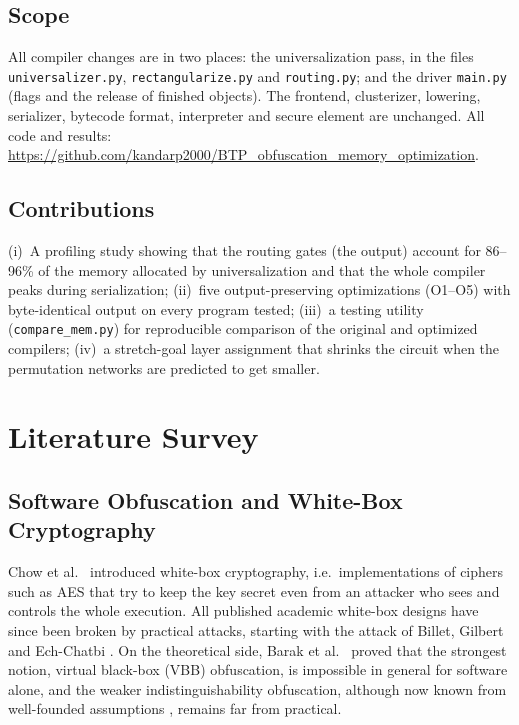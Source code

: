 \documentclass[12pt,a4paper,oneside]{report}
\newcommand{\code}[1]{\texttt{#1}}
\begin{document}
\section{Scope}
{\sloppy All compiler changes are in two places: the universalization pass, in the files
\code{universalizer.py}, \code{rectangularize.py} and \code{routing.py}; and the driver
\code{main.py} (flags and the release of finished objects). The frontend, clusterizer, lowering,
serializer, bytecode format, interpreter and secure element are unchanged. All code and results:
\url{https://github.com/kandarp2000/BTP_obfuscation_memory_optimization}.\par}

\section{Contributions}
(i)~A profiling study showing that the routing gates (the output) account for 86--96\% of the
memory allocated by universalization and that the whole compiler peaks during serialization;
(ii)~five output-preserving optimizations (O1--O5) with byte-identical output on every program
tested; (iii)~a testing utility (\code{compare\_mem.py}) for reproducible comparison of the original
and optimized compilers; (iv)~a stretch-goal layer assignment that shrinks the circuit when the
permutation networks are predicted to get smaller.



\chapter{Literature Survey}

\section{Software Obfuscation and White-Box Cryptography}
Chow et al.\ \cite{chow} introduced white-box cryptography, i.e.\ implementations of ciphers such
as AES \cite{aes} that try to keep the key secret even from an attacker who sees and controls the
whole execution. All published academic white-box designs have since been broken by practical
attacks, starting with the attack of Billet, Gilbert and Ech-Chatbi \cite{billet}. On the
theoretical side, Barak et al.\ \cite{bgi} proved that the strongest notion, virtual black-box
(VBB) obfuscation, is impossible in general for software alone, and the weaker indistinguishability
obfuscation, although now known from well-founded assumptions \cite{jls}, remains far from
practical.
\end{document}
